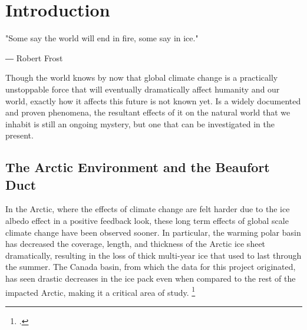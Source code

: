 
\chapter{Introduction}  \label{introduction}

\begin{center}
  \begin{minipage}{0.5\textwidth}
    \begin{small}
      "Some say the world will end in fire, some say in ice." 
      
      ― Robert Frost
    \end{small}
  \end{minipage}
  \vspace{0.5cm}
\end{center}

\noindent Though the world knows by now that global climate change is a practically unstoppable force that will eventually dramatically affect humanity and our world, exactly how it affects this future is not known yet. Is a widely documented and proven phenomena, the resultant effects of it on the natural world that we inhabit is still an ongoing mystery, but one that can be investigated in the present. 

\section{The Arctic Environment and the Beaufort Duct} \label{intro_enviro}

In the Arctic, where the effects of climate change are felt harder due to the ice albedo effect in a positive feedback look, these long term effects of global scale climate change have been observed sooner. In particular, the warming polar basin has decreased the coverage, length, and thickness of the Arctic ice sheet dramatically, resulting in the loss of thick multi-year ice that used to last through the summer. The Canada basin, from which the data for this project originated, has seen drastic decreases in the ice pack even when compared to the rest of the impacted Arctic, making it a critical area of study. \footcite[]{mclaughlin2011rapid}

